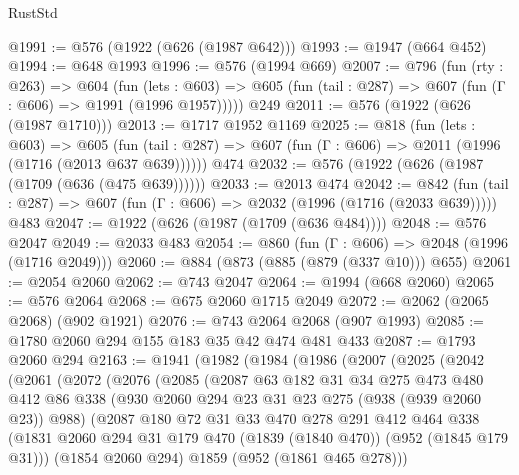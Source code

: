 \begin{lexlean}{RustStd}
\begin{coremodule}
@1991 := @576 (@1922 (@626 (@1987 @642)))
@1993 := @1947 (@664 @452)
@1994 := @648 @1993
@1996 := @576 (@1994 @669)
@2007 := @796
    (fun (rty : @263) =>
    @604
      (fun (lets : @603) =>
      @605 (fun (tail : @287) => @607 (fun (Γ : @606) => @1991 (@1996 @1957)))))
    @249
@2011 := @576 (@1922 (@626 (@1987 @1710)))
@2013 := @1717 @1952 @1169
@2025 := @818
    (fun (lets : @603) =>
    @605 (fun (tail : @287) => @607 (fun (Γ : @606) => @2011 (@1996 (@1716 (@2013 @637 @639))))))
    @474
@2032 := @576 (@1922 (@626 (@1987 (@1709 (@636 (@475 @639))))))
@2033 := @2013 @474
@2042 := @842
    (fun (tail : @287) => @607 (fun (Γ : @606) => @2032 (@1996 (@1716 (@2033 @639)))))
    @483
@2047 := @1922 (@626 (@1987 (@1709 (@636 @484))))
@2048 := @576 @2047
@2049 := @2033 @483
@2054 := @860 (fun (Γ : @606) => @2048 (@1996 (@1716 @2049)))
@2060 := @884 (@873 (@885 (@879 (@337 @10))) @655)
@2061 := @2054 @2060
@2062 := @743 @2047
@2064 := @1994 (@668 @2060)
@2065 := @576 @2064
@2068 := @675 @2060 @1715 @2049
@2072 := @2062 (@2065 @2068) (@902 @1921)
@2076 := @743 @2064 @2068 (@907 @1993)
@2085 := @1780 @2060 @294 @155 @183 @35 @42 @474 @481 @433
@2087 := @1793 @2060 @294
@2163 := @1941
    (@1982
      (@1984
        (@1986
          (@2007
            (@2025
              (@2042
                (@2061
                  (@2072
                    (@2076
                      (@2085
                        (@2087
                          @63
                          @182
                          @31
                          @34
                          @275
                          @473
                          @480
                          @412
                          @86
                          @338
                          (@930 @2060 @294 @23 @31 @23 @275 (@938 (@939 @2060 @23)) @988)
                          (@2087
                            @180
                            @72
                            @31
                            @33
                            @470
                            @278
                            @291
                            @412
                            @464
                            @338
                            (@1831
                              @2060
                              @294
                              @31
                              @179
                              @470
                              (@1839 (@1840 @470))
                              (@952 (@1845 @179 @31)))
                            (@1854 @2060 @294)
                            @1859
                            (@952 (@1861 @465 @278)))

\end{coremodule}
\end{lexlean}
